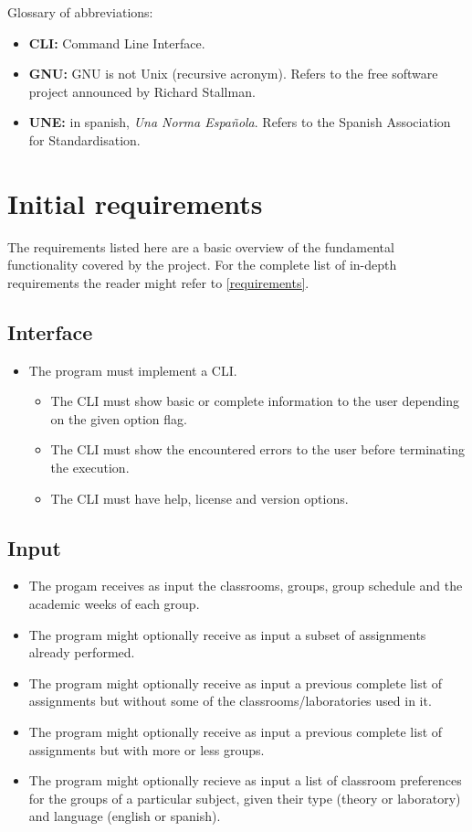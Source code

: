 Glossary of abbreviations:

\begin{itemize}
    \item \textbf{CLI:} Command Line Interface.
    \item \textbf{GNU:} GNU is not Unix (recursive acronym). Refers to the free software project announced by Richard Stallman.
    \item \textbf{UNE:} in spanish, \textit{Una Norma Española}. Refers to the Spanish Association for Standardisation.
\end{itemize}

\section{Initial requirements}

The requirements listed here are a basic overview of the fundamental functionality covered by the project. For the complete list of in-depth requirements the reader might refer to \ref{requirements}.

\subsection{Interface}

\begin{itemize}
    \item The program must implement a CLI.
        \begin{itemize}
            \item The CLI must show basic or complete information to the user depending on the given option flag.
            \item The CLI must show the encountered errors to the user before terminating the execution.
            \item The CLI must have help, license and version options.
        \end{itemize}
\end{itemize}

\subsection{Input}

\begin{itemize}
    \item The progam receives as input the classrooms, groups, group schedule and the academic weeks of each group.
    \item The program might optionally receive as input a subset of assignments already performed.
    \item The program might optionally receive as input a previous complete list of assignments but without some of the classrooms/laboratories used in it.
    \item The program might optionally receive as input a previous complete list of assignments but with more or less groups.
    \item The program might optionally recieve as input a list of classroom preferences for the groups of a particular subject, given their type (theory or laboratory) and language (english or spanish).
\end{itemize}

